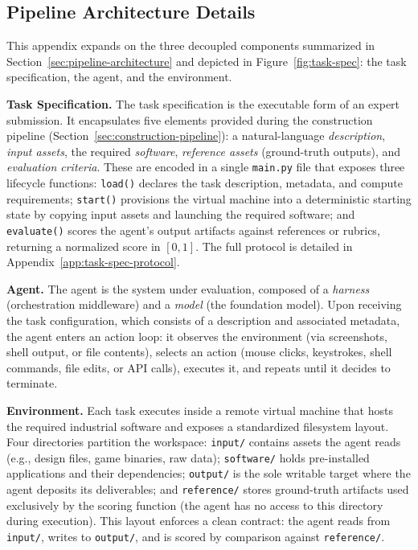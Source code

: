 \documentclass{llmxive}
\begin{document}
\subsection{Pipeline Architecture Details}
\label{app:pipeline-architecture}

This appendix expands on the three decoupled components summarized in Section~\ref{sec:pipeline-architecture} and depicted in Figure~\ref{fig:task-spec}: the task specification, the agent, and the environment.

\noindent \textbf{Task Specification.}
The task specification is the executable form of an expert submission. It encapsulates five elements provided during the construction pipeline (Section~\ref{sec:construction-pipeline}): a natural-language \emph{description}, \emph{input assets}, the required \emph{software}, \emph{reference assets} (ground-truth outputs), and \emph{evaluation criteria}. These are encoded in a single \texttt{main.py} file that exposes three lifecycle functions: \texttt{load()} declares the task description, metadata, and compute requirements; \texttt{start()} provisions the virtual machine into a deterministic starting state by copying input assets and launching the required software; and \texttt{evaluate()} scores the agent's output artifacts against references or rubrics, returning a normalized score in $[0, 1]$. The full protocol is detailed in Appendix~\ref{app:task-spec-protocol}.

\noindent \textbf{Agent.}
The agent is the system under evaluation, composed of a \emph{harness} (orchestration middleware) and a \emph{model} (the foundation model). Upon receiving the task configuration, which consists of a description and associated metadata, the agent enters an action loop: it observes the environment (via screenshots, shell output, or file contents), selects an action (mouse clicks, keystrokes, shell commands, file edits, or API calls), executes it, and repeats until it decides to terminate.

\noindent \textbf{Environment.}
Each task executes inside a remote virtual machine that hosts the required industrial software and exposes a standardized filesystem layout. Four directories partition the workspace: \texttt{input/} contains assets the agent reads (e.g., design files, game binaries, raw data); \texttt{software/} holds pre-installed applications and their dependencies; \texttt{output/} is the sole writable target where the agent deposits its deliverables; and \texttt{reference/} stores ground-truth artifacts used exclusively by the scoring function (the agent has no access to this directory during execution). This layout enforces a clean contract: the agent reads from \texttt{input/}, writes to \texttt{output/}, and is scored by comparison against \texttt{reference/}.
\end{document}
